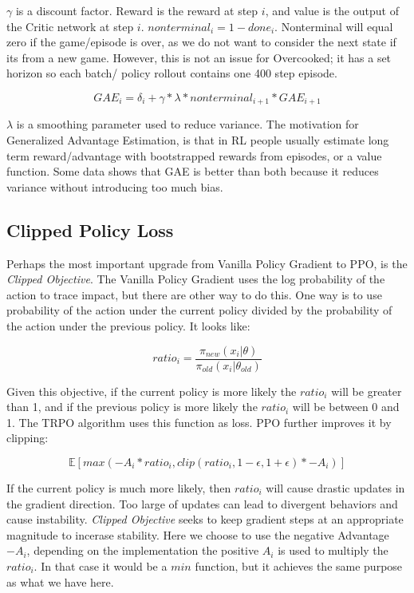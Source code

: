 \documentclass[conference]{IEEEtran}
\begin{document}
$\gamma$ is a discount factor. Reward is the reward at step $i$, and value is the output of the Critic network at step $i$. $nonterminal_i = 1 - done_i$. Nonterminal will 
equal zero if the game/episode is over, as we do not want to consider the next state if its from a new game. 
However, this is not an issue for Overcooked; it has a set horizon so each batch/ policy rollout contains one 400 step episode. 

\begin{equation}
    GAE_i = \delta_i + \gamma * \lambda * nonterminal_{i+1} * GAE_{i+1}
\end{equation}

$\lambda$ is a smoothing parameter used to reduce variance. The motivation for Generalized Advantage Estimation, is that in RL people
usually estimate long term reward/advantage with bootstrapped rewards from episodes, or a value function. Some data shows that GAE is better than both
because it reduces variance without introducing too much bias. 

\subsection{Clipped Policy Loss}
Perhaps the most important upgrade from Vanilla Policy Gradient to PPO, is the \textit{Clipped Objective}. The Vanilla Policy Gradient uses the 
log probability of the action to trace impact, but there are other way to do this. One way is to use probability of the action under the current 
policy divided by the probability of the action under the previous policy. It looks like:

\begin{equation}
    ratio_i = \frac{\pi_{new}(x_i \vert \theta)}  {\pi_{old}(x_i \vert \theta_{old})}
\end{equation}

Given this objective, if the current policy is more likely the $ratio_i$ will be greater than 1, and if the previous policy is more likely the 
$ratio_i$ will be between 0 and 1. The TRPO algorithm uses this function as loss. 
PPO further improves it by clipping:

\begin{equation}
    \mathbb{E}[max(-A_i * ratio_i, clip(ratio_i, 1- \epsilon, 1 + \epsilon) * -A_i)]
\end{equation}

If the current policy is much more likely, then $ratio_i$ will cause drastic updates in the gradient direction. 
Too large of updates can lead to divergent behaviors and cause instability. \textit{Clipped Objective} seeks to keep 
gradient steps at an appropriate magnitude to incerase stability. Here we choose to use the negative Advantage $-A_i$, depending 
on the implementation the positive $A_i$ is used to multiply the $ratio_i$. In that case it would be a $min$ function, but it achieves the same
purpose as what we have here.
\end{document}
